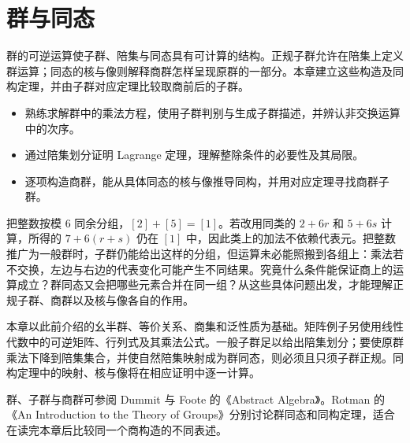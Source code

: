 
\chapter{群与同态}
\label{b1:ch:02}

\begin{chapterabstract}
	群的可逆运算使子群、陪集与同态具有可计算的结构。正规子群允许在陪集上定义群运算；同态的核与像则解释商群怎样呈现原群的一部分。本章建立这些构造及同构定理，并由子群对应定理比较取商前后的子群。
\end{chapterabstract}

\begin{learninggoals}
	\begin{itemize}
		\item 熟练求解群中的乘法方程，使用子群判别与生成子群描述，并辨认非交换运算中的次序。
		\item 通过陪集划分证明 Lagrange 定理，理解整除条件的必要性及其局限。
		\item 逐项构造商群，能从具体同态的核与像推导同构，并用对应定理寻找商群子群。
	\end{itemize}

\end{learninggoals}

把整数按模 \(6\) 同余分组，\([2]+[5]=[1]\)。若改用同类的 \(2+6r\) 和 \(5+6s\) 计算，所得的 \(7+6(r+s)\) 仍在 \([1]\) 中，因此类上的加法不依赖代表元。把整数推广为一般群时，子群仍能给出这样的分组，但运算未必能照搬到各组上：乘法若不交换，左边与右边的代表变化可能产生不同结果。究竟什么条件能保证商上的运算成立？群同态又会把哪些元素合并在同一组？从这些具体问题出发，才能理解正规子群、商群以及核与像各自的作用。

\ProseParagraphBreak

本章以此前介绍的幺半群、等价关系、商集和泛性质为基础。矩阵例子另使用线性代数中的可逆矩阵、行列式及其乘法公式。一般子群足以给出陪集划分；要使原群乘法下降到陪集集合，并使自然陪集映射成为群同态，则必须且只须子群正规。同构定理中的映射、核与像将在相应证明中逐一计算。

\ProseParagraphBreak
群、子群与商群可参阅 Dummit 与 Foote 的《Abstract Algebra》\cite[Sections 1.1, 1.6, 2.1--2.5, 3.1--3.3]{DummitFoote2003}。Rotman 的《An Introduction to the Theory of Groups》\cite[Chapters 1--2]{Rotman1995TheoryGroups}分别讨论群同态和同构定理，适合在读完本章后比较同一个商构造的不同表述。






